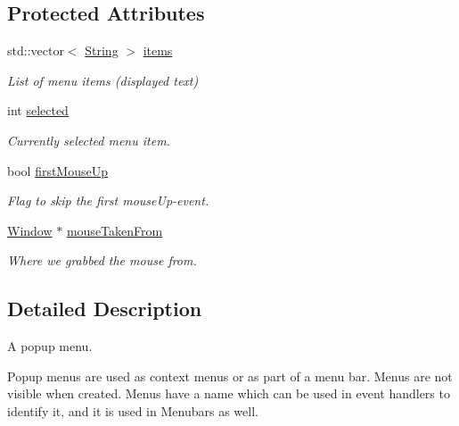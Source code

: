 \subsection*{Protected Attributes}
\begin{DoxyCompactItemize}
\item 
\hypertarget{classGUI_1_1Menu_a79489d4aad9217752d8ca11e5153071a}{std\-::vector$<$ \hyperlink{classGUI_1_1String}{String} $>$ \hyperlink{classGUI_1_1Menu_a79489d4aad9217752d8ca11e5153071a}{items}}\label{classGUI_1_1Menu_a79489d4aad9217752d8ca11e5153071a}

\begin{DoxyCompactList}\small\item\em List of menu items (displayed text) \end{DoxyCompactList}\item 
int \hyperlink{classGUI_1_1Menu_a6934c1ce59c87dc59630390e8fb37e1a}{selected}
\begin{DoxyCompactList}\small\item\em Currently selected menu item. \end{DoxyCompactList}\item 
\hypertarget{classGUI_1_1Menu_a9e895284ef822bb4ddc892a33055ec0f}{bool \hyperlink{classGUI_1_1Menu_a9e895284ef822bb4ddc892a33055ec0f}{first\-Mouse\-Up}}\label{classGUI_1_1Menu_a9e895284ef822bb4ddc892a33055ec0f}

\begin{DoxyCompactList}\small\item\em Flag to skip the first mouse\-Up-\/event. \end{DoxyCompactList}\item 
\hypertarget{classGUI_1_1Menu_a14a3a5fc17c803026ffe5ceded5047b5}{\hyperlink{classGUI_1_1Window}{Window} $\ast$ \hyperlink{classGUI_1_1Menu_a14a3a5fc17c803026ffe5ceded5047b5}{mouse\-Taken\-From}}\label{classGUI_1_1Menu_a14a3a5fc17c803026ffe5ceded5047b5}

\begin{DoxyCompactList}\small\item\em Where we grabbed the mouse from. \end{DoxyCompactList}\end{DoxyCompactItemize}


\subsection{Detailed Description}
A popup menu. 

Popup menus are used as context menus or as part of a menu bar. Menus are not visible when created. Menus have a name which can be used in event handlers to identify it, and it is used in Menubars as well.

